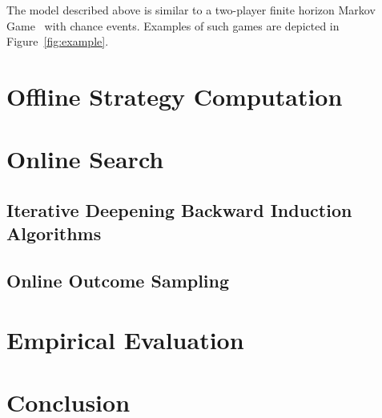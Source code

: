 \documentclass[preprint,12pt]{elsarticle}
\begin{document}
The model described above is similar to a two-player finite horizon Markov Game~\cite{Littman94markovgames} with chance 
events. Examples of such games are depicted in Figure~\ref{fig:example}. 

\section{Offline Strategy Computation}



\section{Online Search}

\subsection{Iterative Deepening Backward Induction Algorithms}

\subsection{Online Outcome Sampling}

\section{Empirical Evaluation}

\section{Conclusion}










\end{document}
